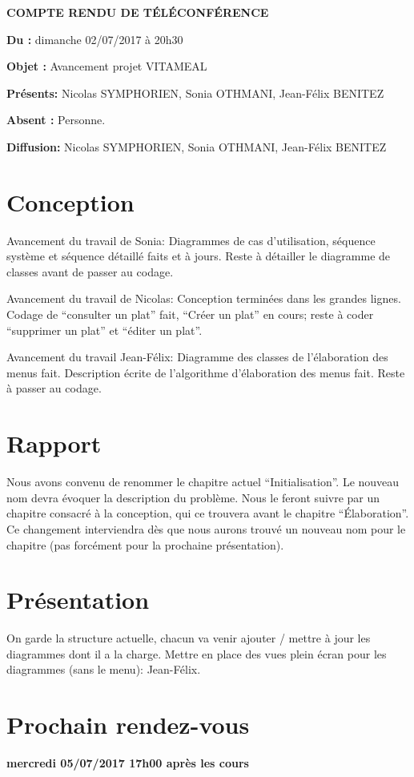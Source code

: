 \documentclass[11pt,a4paper,french,twoside,openright]{article}
\begin{document}
\pagestyle{fancy}

\begin{center}\bfseries\Huge
COMPTE RENDU DE TÉLÉCONFÉRENCE
\end{center}

\textbf{Du      :} dimanche 02/07/2017 à 20h30

\textbf{Objet   :} Avancement projet VITAMEAL

\textbf{Présents:} Nicolas SYMPHORIEN, Sonia OTHMANI, Jean-Félix BENITEZ

\textbf{Absent :} Personne.

\textbf{Diffusion:} Nicolas SYMPHORIEN, Sonia OTHMANI, Jean-Félix BENITEZ

\hrulefill

\section{Conception}
Avancement du travail de Sonia:
Diagrammes de cas d'utilisation, séquence système et séquence détaillé faits et à jours. Reste à détailler le diagramme de classes avant de passer au codage.

Avancement du travail de Nicolas:
Conception terminées dans les grandes lignes. Codage de \enquote{consulter un plat} fait, \enquote{Créer un plat} en cours; reste à coder \enquote{supprimer un plat} et \enquote{éditer un plat}.

Avancement du travail Jean-Félix:
Diagramme des classes de l'élaboration des menus fait. Description écrite de l'algorithme d'élaboration des menus fait. Reste à passer au codage.

\section{Rapport}
Nous avons convenu de renommer le chapitre actuel \enquote{Initialisation}. Le nouveau nom devra évoquer la description du problème. Nous le feront suivre par un chapitre consacré à la conception, qui ce trouvera avant le chapitre \enquote{Élaboration}. Ce changement interviendra dès que  nous aurons trouvé un nouveau nom pour le chapitre (pas forcément pour la prochaine présentation).

\section{Présentation}
On garde la structure actuelle, chacun va venir ajouter / mettre à jour les diagrammes dont il a la charge. Mettre en place des vues plein écran pour les diagrammes (sans le menu): Jean-Félix.

\section{Prochain rendez-vous}
\textbf{mercredi 05/07/2017 17h00 après les cours}
\end{document}
